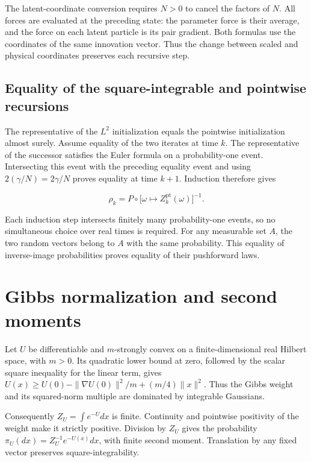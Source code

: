 \documentclass[11pt,a4paper]{article}
\begin{document}
The latent-coordinate conversion requires \(N>0\) to cancel the factors of \(N\). All forces are evaluated at the preceding state: the parameter force is their average, and the force on each latent particle is its pair gradient. Both formulas use the coordinates of the same innovation vector. Thus the change between scaled and physical coordinates preserves each recursive step.



\subsection{\texorpdfstring{Equality of the square-integrable and pointwise recursions}{Equality of the square-integrable and pointwise recursions}}


The representative of the \(L^2\) initialization equals the pointwise initialization almost surely. Assume equality of the two iterates at time \(k\). The representative of the successor satisfies the Euler formula on a probability-one event. Intersecting this event with the preceding equality event and using \(2(\gamma/N)=2\gamma/N\) proves equality at time \(k+1\). Induction therefore gives

\[\rho_k=P\circ\bigl[\omega\mapsto Z_k^{\mathrm{pt}}(\omega)\bigr]^{-1}.\]

Each induction step intersects finitely many probability-one events, so no simultaneous choice over real times is required. For any measurable set \(A\), the two random vectors belong to \(A\) with the same probability. This equality of inverse-image probabilities proves equality of their pushforward laws.




\section{\texorpdfstring{Gibbs normalization and second moments}{Gibbs normalization and second moments}}


Let \(U\) be differentiable and \(m\)-strongly convex on a finite-dimensional real Hilbert space, with \(m>0\). Its quadratic lower bound at zero, followed by the scalar square inequality for the linear term, gives \(U(x)\ge U(0)-\|\nabla U(0)\|^2/m+(m/4)\|x\|^2\). Thus the Gibbs weight and its squared-norm multiple are dominated by integrable Gaussians.



Consequently \(Z_U=\int e^{-U}dx\) is finite. Continuity and pointwise positivity of the weight make it strictly positive. Division by \(Z_U\) gives the probability \(\pi_U(dx)=Z_U^{-1}e^{-U(x)}dx\), with finite second moment. Translation by any fixed vector preserves square-integrability.
\end{document}
